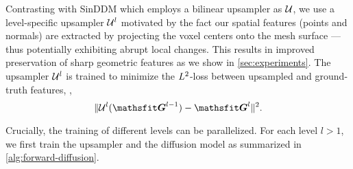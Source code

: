 \noindent Contrasting with SinDDM which employs a bilinear upsampler as \(\mathcal{U}\), we use a level-specific upsampler \(\mathcal{U}^{l}\) motivated by the fact our spatial features (points and normals) are extracted by projecting the voxel centers onto the mesh surface --- thus potentially exhibiting abrupt local changes.
This results in improved preservation of sharp geometric features as we show in \cref{sec:experiments}.
The upsampler \(\mathcal{U}^{l}\) is trained to minimize the \(L^2\)-loss between upsampled and ground-truth features, \ie, 
\begin{equation}
\lVert \upsampler^{\lvl}(\grid^{\lvl-1}) - \grid^{\lvl} \rVert^2. \label{eq:upsampler-loss}
\end{equation}


Crucially, the training of different levels can be parallelized. For each level \(l>1\), we first train the upsampler and the diffusion model as summarized in \cref{alg:forward-diffusion}.


